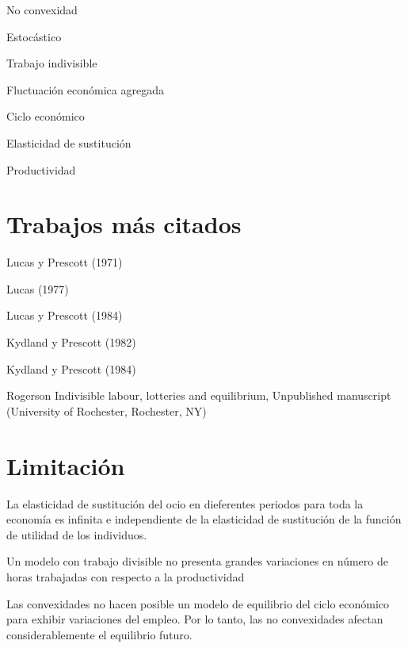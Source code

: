 \documentclass{article}
\begin{document}
 No convexidad

Estocástico

Trabajo indivisible


Fluctuación económica agregada


Ciclo económico


Elasticidad de sustitución

Productividad

\section{Trabajos más citados}

Lucas y Prescott (1971)

Lucas (1977)

Lucas y Prescott (1984)

Kydland y Prescott (1982)

Kydland y Prescott (1984)

Rogerson Indivisible labour, lotteries and equilibrium, Unpublished manuscript (University of Rochester, Rochester, NY)

\section{Limitación}

La elasticidad de sustitución del ocio en dieferentes periodos para toda la economía es infinita e independiente de la elasticidad  de sustitución de la función de utilidad de los individuos.

Un modelo con trabajo divisible no presenta grandes variaciones en número de horas trabajadas con respecto a la productividad

Las convexidades no hacen posible un modelo de equilibrio del ciclo económico para exhibir variaciones del empleo. Por lo tanto, las no convexidades afectan considerablemente el equilibrio futuro.
\end{document}
